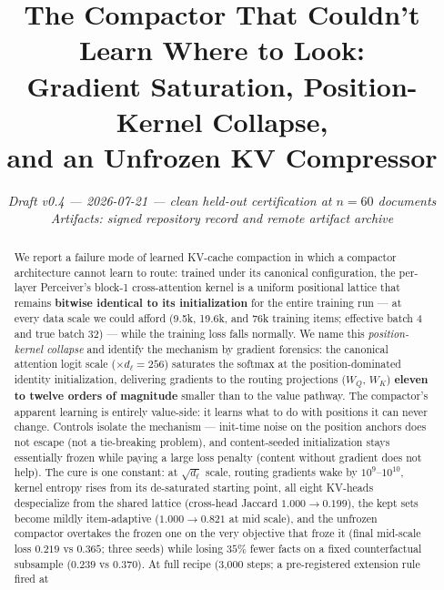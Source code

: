\documentclass[11pt]{article}
\title{The Compactor That Couldn't Learn Where to Look:\\
Gradient Saturation, Position-Kernel Collapse,\\
and an Unfrozen KV Compressor}
\author{%
  \textit{Draft v0.4 --- 2026-07-21 --- clean held-out certification at $n{=}60$ documents}\\
  \textit{Artifacts: signed repository record and remote artifact archive}}
\date{}
\newcommand{\dl}{d_{\ell}}
\begin{document}
\maketitle

\begin{center}
\end{center}

\begin{abstract}
We report a failure mode of learned KV-cache compaction in which a
compactor architecture cannot learn to route: trained under its canonical
configuration, the per-layer Perceiver's block-1 cross-attention kernel is
a uniform positional lattice that remains \textbf{bitwise identical to its
initialization} for the entire training run --- at every data scale we
could afford (9.5k, 19.6k, and 76k training items; effective batch 4 and
true batch 32) --- while the training loss falls normally. We name this
\emph{position-kernel collapse} and identify the mechanism by gradient
forensics: the canonical attention logit scale ($\times \dl = 256$)
saturates the softmax at the position-dominated identity initialization,
delivering gradients to the routing projections ($W_Q$, $W_K$)
\textbf{eleven to twelve orders of magnitude} smaller than to the value
pathway. The compactor's apparent learning is entirely value-side: it
learns what to do with positions it can never change. Controls isolate
the mechanism --- init-time noise on the position anchors does not escape
(not a tie-breaking problem), and content-seeded initialization stays
essentially frozen while paying a large loss penalty (content without
gradient does not help). The cure is one constant: at $\sqrt{\dl}$ scale,
routing gradients wake by $10^{9}$--$10^{10}$, kernel entropy rises from
its de-saturated starting point, all eight KV-heads despecialize from the
shared lattice (cross-head Jaccard $1.000 \to 0.199$), the kept sets
become mildly item-adaptive ($1.000 \to 0.821$ at mid scale), and the
unfrozen compactor overtakes the frozen one on the very objective that
froze it (final mid-scale loss $0.219$ vs $0.365$; three seeds) while
losing $35\%$ fewer facts on a fixed counterfactual subsample ($0.239$ vs
$0.370$). At full recipe (3{,}000 steps; a pre-registered extension rule fired at

\end{abstract}
\end{document}
